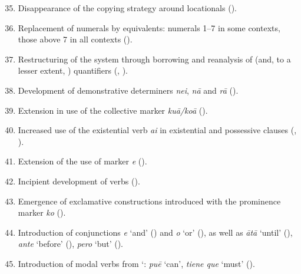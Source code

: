 \begin{enumerate}
\setcounter{enumi}{34}
\item 
Disappearance of the  copying strategy around locationals ().

\item 
Replacement of numerals by  equivalents: numerals 1–7 in some contexts, those above 7 in all contexts ().

\item 
Restructuring of the  system through borrowing and reanalysis of  (and, to a lesser extent, ) quantifiers (, ).

\item 
Development of demonstrative determiners \textit{nei}, \textit{nā} and \textit{rā} ().

\item 
Extension in use of the collective marker \textit{ku}\textit{ā}\textit{/koā} ().

\item 
Increased use of the existential verb \textit{ai} in existential and possessive clauses (, ).

\item 
Extension of the use of  marker \textit{e} ().

\item 
Incipient development of  verbs ().

\item 
Emergence of exclamative constructions introduced with the prominence marker \textit{ko} ().

\item 
Introduction of conjunctions \textit{{\ꞌ}e} ‘and’ () and \textit{{\ꞌ}o} ‘or’ (), as well as \textit{{\ꞌ}ātā} ‘until’ (), \textit{ante} ‘before’ (), \textit{pero} ‘but’ ().

\item 
Introduction of modal verbs from `: \textit{pu}\textit{ē} ‘can’, \textit{tiene que} ‘must’ ().

\end{enumerate}
